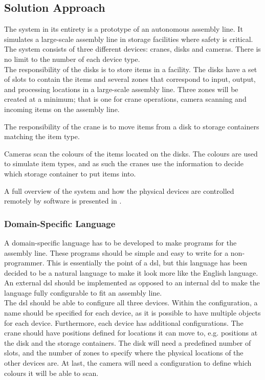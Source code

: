 \subsection{Solution Approach}

The system in its entirety is a prototype of an autonomous assembly line. It simulates a large-scale assembly line in storage facilities where safety is critical. The system consists of three different devices: cranes, disks and cameras. There is no limit to the number of each device type.
\\

The responsibility of the disks is to store items in a facility. The disks have a set of slots to contain the items and several zones that correspond to input, output, and processing locations in a large-scale assembly line. Three zones will be created at a minimum; that is one for crane operations, camera scanning and incoming items on the assembly line.

The responsibility of the crane is to move items from a disk to storage containers matching the item type.

Cameras scan the colours of the items located on the disks. The colours are used to simulate item types, and as such the cranes use the information to decide which storage container to put items into.

A full overview of the system and how the physical devices are controlled remotely by software is presented in .

\subsubsection{Domain-Specific Language}\label{sec:sa-dsl}
\hfill

A domain-specific language has to be developed to make programs for the assembly line. These programs should be simple and easy to write for a non-programmer. This is essentially the point of a \acrshort{dsl}, but this language has been decided to be a natural language to make it look more like the English language. An external \acrshort{dsl} should be implemented as opposed to an internal \acrshort{dsl} to make the language fully configurable to fit an assembly line.\\

The \acrshort{dsl} should be able to configure all three devices. Within the configuration, a name should be specified for each device, as it is possible to have multiple objects for each device. Furthermore, each device has additional configurations. The crane should have positions defined for locations it can move to, e.g. positions at the disk and the storage containers. The disk will need a predefined number of slots, and the number of zones to specify where the physical locations of the other devices are. At last, the camera will need a configuration to define which colours it will be able to scan.\\

